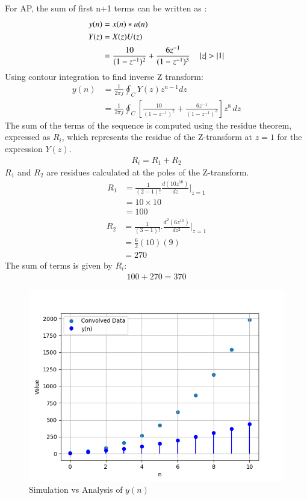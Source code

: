 \documentclass[journal,12pt,twocolumn]{IEEEtran}
\theoremstyle{remark}
\begin{document}
For AP, the sum of first n+1 terms can be written as :
\begin{align}
	 y(n)&=x(n)*u(n) \\
	 Y(z) &= X(z)U(z)\\
	&=\frac{10}{(1-z^{-1})^2} + \frac{6z^{-1}}{(1-z^{-1})^3}
	\quad \left\vert z\right\vert>\left\vert1\right\vert
\end{align}
Using contour integration to find inverse Z transform:
\begin{align}
	y(n) &= \frac{1}{2\pi j} \oint_C Y(z) z^{n-1} dz\\
	&= \frac{1}{2\pi j} \oint_C [ \frac{10}{(1-z^{-1})^2} + \frac{6z^{-1}}{(1-z^{-1})^3} ]z^{8} \, dz
\end{align}
The sum of the terms of the sequence is computed using the residue theorem, expressed as $R_i$, which represents the residue of the Z-transform at $ z=1 $ for the expression $ Y(z) $.
\begin{align}
	R_i=R_1 + R_2
\end{align}
 $R_1$ and $R_2$ are residues calculated at the poles of the Z-transform.
\begin{align}
		R_1 &= \frac{1}{{(2-1)!}}  \frac{d (10z^{10})}{dz} |_{z=1} \\
	&=10\times 10 \\
	&=100
\end{align}
\begin{align}
	R_2 &= \frac{1}{{(3-1)!}} . \frac{d^2(6z^{10})}{dz^2} |_{z=1} \\
	&= \frac{6}{2}(10)(9) \\
	&= 270
\end{align}
The sum of terms is given by $R_i$:
 \begin{align}
100 + 270 = 370
\end{align}
\begin{figure}[H]
    \centering
    \includegraphics[width=\columnwidth]{figs/combined_plot.png}
    \caption{Simulation vs Analysis of $y(n)$}
    \label{fig:11.9.5.8fig1}
\end{figure}
\end{document}
